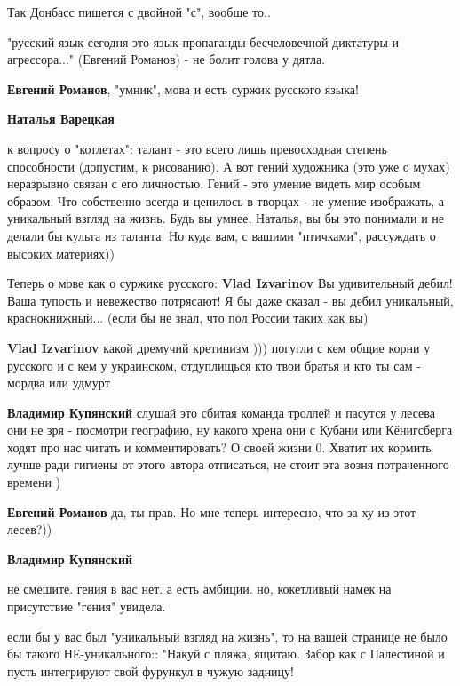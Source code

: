 \begin{itemize}
\begin{itemize}
Так Донбасс пишется с двойной "с", вообще то..


"русский язык сегодня это язык пропаганды бесчеловечной диктатуры и
агрессора..." (Евгений Романов) - не болит голова у дятла.

\textbf{Евгений Романов}, "умник", мова и есть суржик русского языка!

\textbf{Наталья Варецкая} 

к вопросу о "котлетах": талант - это всего лишь превосходная степень
способности (допустим, к рисованию). А вот гений художника (это уже о мухах)
неразрывно связан с его личностью. Гений - это умение видеть мир особым
образом. Что собственно всегда и ценилось в творцах - не умение изображать, а
уникальный взгляд на жизнь. Будь вы умнее, Наталья, вы бы это понимали и не
делали бы культа из таланта. Но куда вам, с вашими "птичками", рассуждать о
высоких материях))


Теперь о мове как о суржике русского: \textbf{Vlad Izvarinov} Вы удивительный дебил!
Ваша тупость и невежество потрясают! Я бы даже сказал - вы дебил уникальный,
краснокнижный... (если бы не знал, что пол России таких как вы)


\textbf{Vlad Izvarinov} какой дремучий кретинизм ))) погугли с кем общие корни у русского и с кем у украинском, отдуплищься кто твои братья и кто ты сам - мордва или удмурт

\textbf{Владимир Купянский} слушай это сбитая команда троллей и пасутся у лесева они не зря - посмотри географию, ну какого хрена они с Кубани или Кёнигсберга ходят про нас читать и комментировать? О своей жизни 0. Хватит их кормить лучше ради гигиены от этого автора отписаться, не стоит эта возня потраченного времени )

\textbf{Евгений Романов} да, ты прав. Но мне теперь интересно, что за ху из этот лесев?))

\textbf{Владимир Купянский} 

не смешите. гения в вас нет. а есть амбиции. но, кокетливый намек на
присутствие "гения" увидела.

если бы у вас был "уникальный взгляд на жизнь", то на вашей странице не было бы
такого НЕ-уникального:: "Накуй с пляжа, ящитаю. Забор как с Палестиной и пусть
интегрируют свой фурункул в чужую задницу!


\end{itemize}
\end{itemize}
